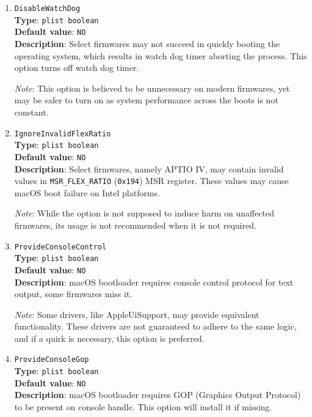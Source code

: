 \documentclass[]{article}
\begin{document}
\begin{enumerate}
\item
  \texttt{DisableWatchDog}\\
  \textbf{Type}: \texttt{plist\ boolean}\\
  \textbf{Default value}: \texttt{NO}\\
  \textbf{Description}: Select firmwares may not succeed in quickly booting
  the operating system, which results in watch dog timer aborting the process.
  This option turns off watch dog timer.

  \emph{Note}: This option is believed to be unnecessary on modern firmwares,
  yet may be safer to turn on as system performance across the boots is not
  constant.

\item
  \texttt{IgnoreInvalidFlexRatio}\\
  \textbf{Type}: \texttt{plist\ boolean}\\
  \textbf{Default value}: \texttt{NO}\\
  \textbf{Description}: Select firmwares, namely APTIO IV, may contain invalid values in
  \texttt{MSR\_FLEX\_RATIO} (\texttt{0x194}) MSR register. These values may cause
  macOS boot failure on Intel platforms.

  \emph{Note}: While the option is not supposed to induce harm on unaffected firmwares,
  its usage is not recommended when it is not required.

\item
  \texttt{ProvideConsoleControl}\\
  \textbf{Type}: \texttt{plist\ boolean}\\
  \textbf{Default value}: \texttt{NO}\\
  \textbf{Description}: macOS bootloader requires console control protocol
  for text output, some firmwares miss it.

  \emph{Note}: Some drivers, like AppleUiSupport, may provide equivalent functionality.
  These drivers are not guaranteed to adhere to the same logic, and if a quirk is
  necessary, this option is preferred.

\item
  \texttt{ProvideConsoleGop}\\
  \textbf{Type}: \texttt{plist\ boolean}\\
  \textbf{Default value}: \texttt{NO}\\
  \textbf{Description}: macOS bootloader requires GOP (Graphics Output Protocol)
  to be present on console handle. This option will install it if missing.


\end{enumerate}
\end{document}
